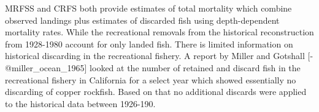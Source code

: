 \documentclass[
]{article}
\begin{document}
MRFSS and CRFS both provide estimates of total mortality which combine
observed landings plus estimates of discarded fish using depth-dependent
mortality rates. While the recreational removals from the historical
reconstruction from 1928-1980 account for only landed fish. There is
limited information on historical discarding in the recreational
fishery. A report by Miller and Gotshall {[}-@miller\_ocean\_1965{]}
looked at the number of retained and discard fish in the recreational
fishery in California for a select year which showed essentially no
discarding of copper rockfish. Based on that no additional discards were
applied to the historical data between 1926-190.
\end{document}
